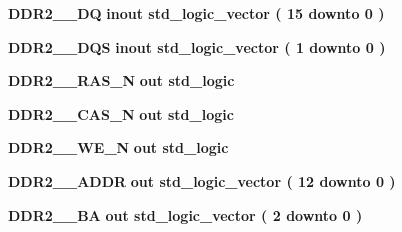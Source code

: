 \begin{DoxyCompactItemize}
\item 
{\bf D\+D\+R2\+\_\+\_\+\+DQ}  {\bfseries {\bfseries \textcolor{keywordflow}{inout}\textcolor{vhdlchar}{ }}} {\bfseries \textcolor{comment}{std\+\_\+logic\+\_\+vector}\textcolor{vhdlchar}{ }\textcolor{vhdlchar}{(}\textcolor{vhdlchar}{ }\textcolor{vhdlchar}{ } \textcolor{vhdldigit}{15} \textcolor{vhdlchar}{ }\textcolor{keywordflow}{downto}\textcolor{vhdlchar}{ }\textcolor{vhdlchar}{ } \textcolor{vhdldigit}{0} \textcolor{vhdlchar}{ }\textcolor{vhdlchar}{)}\textcolor{vhdlchar}{ }} 
\item 
{\bf D\+D\+R2\+\_\+\_\+\+D\+QS}  {\bfseries {\bfseries \textcolor{keywordflow}{inout}\textcolor{vhdlchar}{ }}} {\bfseries \textcolor{comment}{std\+\_\+logic\+\_\+vector}\textcolor{vhdlchar}{ }\textcolor{vhdlchar}{(}\textcolor{vhdlchar}{ }\textcolor{vhdlchar}{ } \textcolor{vhdldigit}{1} \textcolor{vhdlchar}{ }\textcolor{keywordflow}{downto}\textcolor{vhdlchar}{ }\textcolor{vhdlchar}{ } \textcolor{vhdldigit}{0} \textcolor{vhdlchar}{ }\textcolor{vhdlchar}{)}\textcolor{vhdlchar}{ }} 
\item 
{\bf D\+D\+R2\+\_\+\_\+\+R\+A\+S\+\_\+N}  {\bfseries {\bfseries \textcolor{keywordflow}{out}\textcolor{vhdlchar}{ }}} {\bfseries \textcolor{comment}{std\+\_\+logic}\textcolor{vhdlchar}{ }} 
\item 
{\bf D\+D\+R2\+\_\+\_\+\+C\+A\+S\+\_\+N}  {\bfseries {\bfseries \textcolor{keywordflow}{out}\textcolor{vhdlchar}{ }}} {\bfseries \textcolor{comment}{std\+\_\+logic}\textcolor{vhdlchar}{ }} 
\item 
{\bf D\+D\+R2\+\_\+\_\+\+W\+E\+\_\+N}  {\bfseries {\bfseries \textcolor{keywordflow}{out}\textcolor{vhdlchar}{ }}} {\bfseries \textcolor{comment}{std\+\_\+logic}\textcolor{vhdlchar}{ }} 
\item 
{\bf D\+D\+R2\+\_\+\_\+\+A\+D\+DR}  {\bfseries {\bfseries \textcolor{keywordflow}{out}\textcolor{vhdlchar}{ }}} {\bfseries \textcolor{comment}{std\+\_\+logic\+\_\+vector}\textcolor{vhdlchar}{ }\textcolor{vhdlchar}{(}\textcolor{vhdlchar}{ }\textcolor{vhdlchar}{ } \textcolor{vhdldigit}{12} \textcolor{vhdlchar}{ }\textcolor{keywordflow}{downto}\textcolor{vhdlchar}{ }\textcolor{vhdlchar}{ } \textcolor{vhdldigit}{0} \textcolor{vhdlchar}{ }\textcolor{vhdlchar}{)}\textcolor{vhdlchar}{ }} 
\item 
{\bf D\+D\+R2\+\_\+\_\+\+BA}  {\bfseries {\bfseries \textcolor{keywordflow}{out}\textcolor{vhdlchar}{ }}} {\bfseries \textcolor{comment}{std\+\_\+logic\+\_\+vector}\textcolor{vhdlchar}{ }\textcolor{vhdlchar}{(}\textcolor{vhdlchar}{ }\textcolor{vhdlchar}{ } \textcolor{vhdldigit}{2} \textcolor{vhdlchar}{ }\textcolor{keywordflow}{downto}\textcolor{vhdlchar}{ }\textcolor{vhdlchar}{ } \textcolor{vhdldigit}{0} \textcolor{vhdlchar}{ }\textcolor{vhdlchar}{)}\textcolor{vhdlchar}{ }} 

\end{DoxyCompactItemize}
